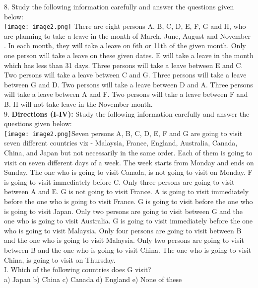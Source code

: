 \documentclass[
]{article}
\begin{document}
8. Study the following information carefully and answer the questions given below:\\
\texttt{[image: image2.png]}
There are eight persons A, B, C, D, E, F, G and H, who are planning to take a leave in the
month of March, June, August and November . In each month, they will take a leave on 6th
or 11th of the given month. Only one person will take a leave on these given dates. E will
take a leave in the month which has less than 31 days. Three persons will take a leave
between E and C. Two persons will take a leave between C and G. Three persons will take a
leave between G and D. Two persons will take a leave between D and A. Three persons will
take a leave between A and F. Two persons will take a leave between F and B. H will not
take leave in the November month.\\

9. \textbf{Directions (I-IV):} Study the following information carefully and answer the questions given below:\\
\texttt{[image: image2.png]}Seven persons A, B, C, D, E, F and G are going to visit seven different countries viz -
Malaysia, France, England, Australia, Canada, China, and Japan but not necessarily in the
same order. Each of them is going to visit on seven different days of a week. The week starts
from Monday and ends on Sunday. The one who is going to visit Canada, is not going to
visit on Monday. F is going to visit immediately before C. Only three persons are going to
visit between A and E. G is not going to visit France. A is going to visit immediately before
the one who is going to visit France. G is going to visit before the one who is going to visit
Japan. Only two persons are going to visit between G and the one who is going to visit
Australia. G is going to visit immediately before the one who is going to visit Malaysia.
Only four persons are going to visit between B and the one who is going to visit Malaysia.
Only two persons are going to visit between B and the one who is going to visit China. The
one who is going to visit China, is going to visit on Thursday.\\

I. Which of the following countries does G visit?\\
a) Japan \hspace{2mm}b) China \hspace{2mm}c) Canada \hspace{2mm}d) England \hspace{2mm}e) None of these\\
\end{document}
